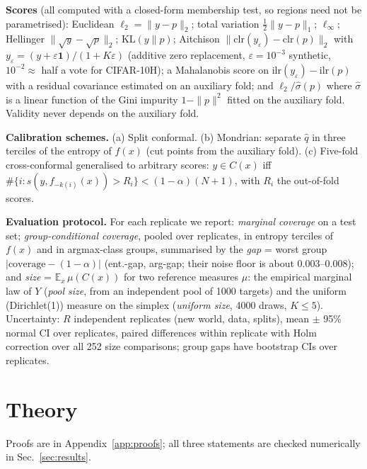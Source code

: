 \documentclass{article}
\theoremstyle{plain}
\theoremstyle{remark}
\newcommand{\E}{\mathbb{E}}
\newcommand{\clr}{\mathrm{clr}}
\begin{document}
\textbf{Scores} (all computed with a closed-form membership test, so regions need not be parametrised): Euclidean $\ell_2=\|y-p\|_2$; total variation $\tfrac12\|y-p\|_1$; $\ell_\infty$; Hellinger $\|\sqrt y-\sqrt p\|_2$; $\mathrm{KL}(y\|p)$; Aitchison $\|\clr(y_\varepsilon)-\clr(p)\|_2$ with $y_\varepsilon=(y+\varepsilon\mathbf 1)/(1+K\varepsilon)$ (additive zero replacement, $\varepsilon=10^{-3}$ synthetic, $10^{-2}\approx$ half a vote for CIFAR-10H); a Mahalanobis score on $\mathrm{ilr}(y_\varepsilon)-\mathrm{ilr}(p)$ with a residual covariance estimated on an auxiliary fold; and $\ell_2/\hat\sigma(p)$ where $\hat\sigma$ is a linear function of the Gini impurity $1-\|p\|^2$ fitted on the auxiliary fold. Validity never depends on the auxiliary fold.

\textbf{Calibration schemes.} (a) Split conformal. (b) Mondrian: separate $\hat q$ in three terciles of the entropy of $f(x)$ (cut points from the auxiliary fold). (c) Five-fold cross-conformal \citep{vovk2015cross} generalised to arbitrary scores: $y\in C(x)$ iff $\#\{i: s(y,f_{-k(i)}(x))>R_i\}<(1-\alpha)(N+1)$, with $R_i$ the out-of-fold scores.

\textbf{Evaluation protocol.} For each replicate we report: \emph{marginal coverage} on a test set; \emph{group-conditional coverage}, pooled over replicates, in entropy terciles of $f(x)$ and in argmax-class groups, summarised by the \emph{gap} = worst group $|\text{coverage}-(1-\alpha)|$ (ent.-gap, arg-gap; their noise floor is about $0.003$--$0.008$); and \emph{size} = $\E_{x}\,\mu(C(x))$ for two reference measures $\mu$: the empirical marginal law of $Y$ (\emph{pool size}, from an independent pool of 1000 targets) and the uniform (Dirichlet(1)) measure on the simplex (\emph{uniform size}, 4000 draws, $K\le5$). Uncertainty: $R$ independent replicates (new world, data, splits), mean $\pm$ 95\% normal CI over replicates, paired differences within replicate with Holm correction over all 252 size comparisons; group gaps have bootstrap CIs over replicates.

\section{Theory}
\label{sec:theory}
Proofs are in Appendix~\ref{app:proofs}; all three statements are checked numerically in Sec.~\ref{sec:results}.
\end{document}
